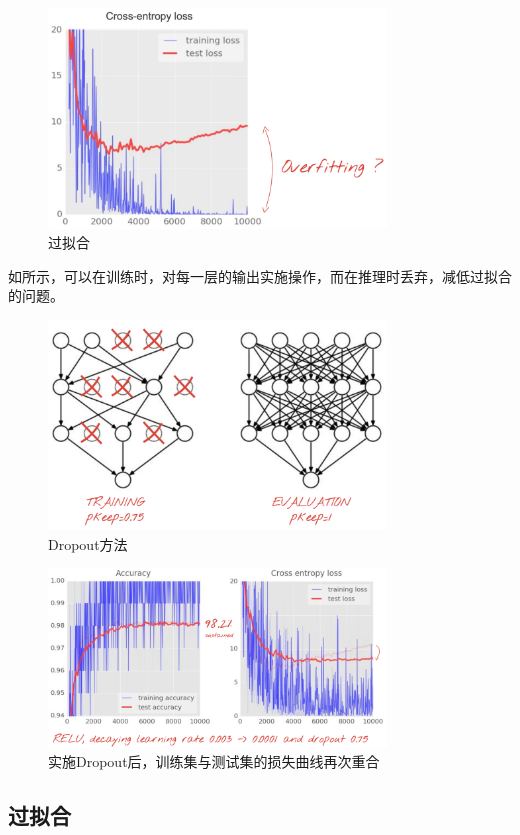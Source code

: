 \begin{content}
\begin{figure}[H]
\centering
\includegraphics[width=0.8\textwidth]{figures/mnist-overfitting.png}
\caption{过拟合}
 \label{fig:mnist-overfitting}
\end{figure}

如所示，可以在训练时，对每一层的输出实施操作，而在推理时丢弃，减低过拟合的问题。

\begin{figure}[H]
\centering
\includegraphics[width=0.8\textwidth]{figures/mnist-dropout.png}
\caption{Dropout方法}
 \label{fig:mnist-dropout}
\end{figure}


\begin{figure}[H]
\centering
\includegraphics[width=0.8\textwidth]{figures/mnist-apply-dropout-result.png}
\caption{实施Dropout后，训练集与测试集的损失曲线再次重合}
 \label{fig:mnist-apply-dropout-result}
\end{figure}

\subsection{过拟合}

\end{content}
